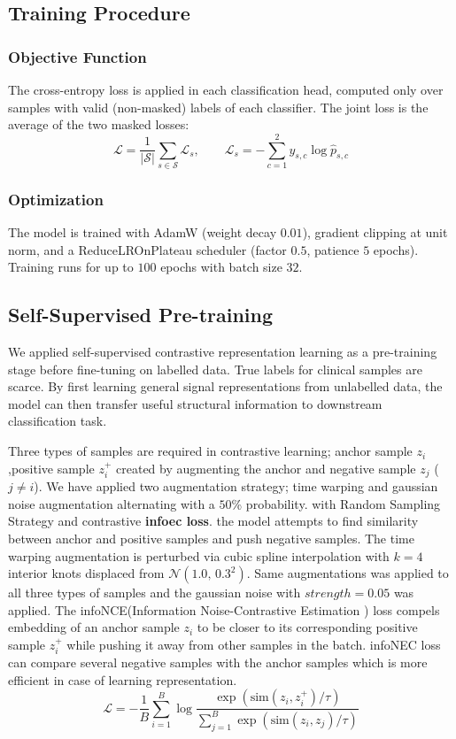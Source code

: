 \documentclass[conference]{IEEEtran}
\begin{document}
\subsection{Training Procedure}

\subsubsection{Objective Function}
The cross-entropy loss is applied in each classification head, computed only over samples with valid (non-masked) labels of each classifier. The joint loss is the average of the two masked losses:
\begin{equation}
\mathcal{L} = \frac{1}{|\mathcal{S}|} \sum_{s \in \mathcal{S}} \mathcal{L}_s, \qquad
\mathcal{L}_s = -\sum_{c=1}^{2} y_{s,c} \log \hat{p}_{s,c}
\end{equation}

\subsubsection{Optimization}
The model is trained with AdamW (weight decay $0.01$), gradient clipping at unit norm, and a ReduceLROnPlateau scheduler (factor $0.5$, patience $5$ epochs). Training runs for up to $100$ epochs with batch size $32$.

\subsection{Self-Supervised Pre-training}
\label{sec:ssl}
We applied self-supervised contrastive representation learning as a pre-training stage before fine-tuning on labelled data. True labels for clinical samples are scarce. By first learning general signal representations from unlabelled data, the model can then transfer useful structural information to downstream classification task.

Three types of samples are required in contrastive learning; anchor sample  $z_i$,positive sample $z_i^+$ created by augmenting the anchor  and negative sample $z_j$ ($j \neq i$).  
We have applied two augmentation strategy; time warping and gaussian noise augmentation alternating with a $50$\% probability. with Random Sampling Strategy and contrastive \textbf{infoec loss}. 
the model attempts to find similarity between anchor and positive samples and push negative samples.
The time warping augmentation is perturbed via cubic spline interpolation with $k{=}4$ interior knots displaced from $\mathcal{N}(1.0,\, 0.3^2)$. Same augmentations was applied to all three types of samples and the gaussian noise with  $strength = 0.05$ was applied.
The infoNCE(Information Noise-Contrastive Estimation ) loss compels embedding of an anchor sample   $z_i$  to be closer to its corresponding positive sample   $z_i^+$ while pushing it away from other samples in the batch. infoNEC loss can compare several negative samples with the anchor samples which is more efficient in case of learning representation.
\begin{equation}
\mathcal{L} = 
- \frac{1}{B} \sum_{i=1}^{B}
\log \frac{
\exp\left(\mathrm{sim}(z_i, z_i^+)/\tau\right)
}{
\sum_{j=1}^{B} \exp\left(\mathrm{sim}(z_i, z_j)/\tau\right)
}
\end{equation}
\end{document}
